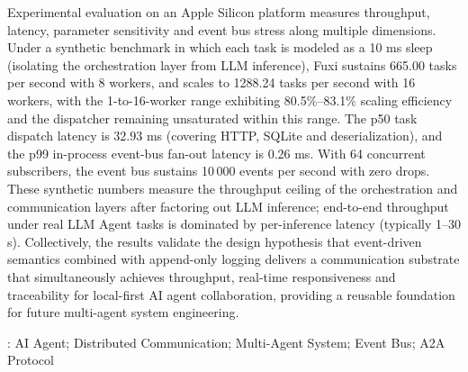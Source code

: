 Experimental evaluation on an Apple Silicon platform measures throughput, latency, parameter sensitivity and event bus stress along multiple dimensions. Under a synthetic benchmark in which each task is modeled as a 10 ms sleep (isolating the orchestration layer from LLM inference), Fuxi sustains 665.00 tasks per second with 8 workers, and scales to 1288.24 tasks per second with 16 workers, with the 1-to-16-worker range exhibiting 80.5\%--83.1\% scaling efficiency and the dispatcher remaining unsaturated within this range. The p50 task dispatch latency is 32.93 ms (covering HTTP, SQLite and deserialization), and the p99 in-process event-bus fan-out latency is 0.26 ms. With 64 concurrent subscribers, the event bus sustains 10\,000 events per second with zero drops. These synthetic numbers measure the throughput ceiling of the orchestration and communication layers after factoring out LLM inference; end-to-end throughput under real LLM Agent tasks is dominated by per-inference latency (typically 1--30 s). Collectively, the results validate the design hypothesis that event-driven semantics combined with append-only logging delivers a communication substrate that simultaneously achieves throughput, real-time responsiveness and traceability for local-first AI agent collaboration, providing a reusable foundation for future multi-agent system engineering.

\vspace{1.5em}

: AI Agent; Distributed Communication; Multi-Agent System; Event Bus; A2A Protocol
